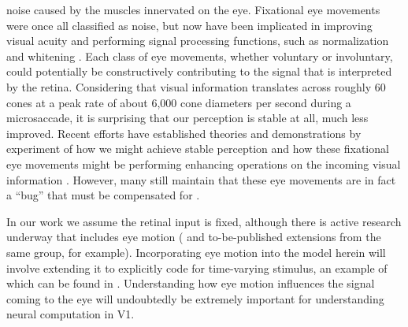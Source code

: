 noise caused by the muscles innervated on the eye. Fixational eye movements were once all classified as noise, but now have been implicated in improving visual acuity \parencite{ratnam2017benefits, rucci2007miniature} and performing signal processing functions, such as normalization and whitening \parencite{aytekin2014visual}. Each class of eye movements, whether voluntary or involuntary, could potentially be constructively contributing to the signal that is interpreted by the retina. Considering that visual information translates across roughly 60 cones at a peak rate of about 6,000 cone diameters per second during a microsaccade, it is surprising that our perception is stable at all, much less improved. Recent efforts have established theories and demonstrations by experiment of how we might achieve stable perception \parencite{arathorn2013unstable, bridgeman2010brain, murakami1998jitter, burak2010bayesian} and how these fixational eye movements might be performing enhancing operations on the incoming visual information \parencite{ahissar2012seeing, mostofi2016visual, kenyon2004correlated}. However, many still maintain that these eye movements are in fact a ``bug'' that must be compensated for \parencite{packer1992blurring, kowler1979miniature, engbert2011integrated}.

In our work we assume the retinal input is fixed, although there is active research underway that includes eye motion (\cite{ratnam2017benefits} and to-be-published extensions from the same group, for example). Incorporating eye motion into the model herein will involve extending it to explicitly code for time-varying stimulus, an example of which can be found in \parencite{olshausen2003learning}. Understanding how eye motion influences the signal coming to the eye will undoubtedly be extremely important for understanding neural computation in V1. 


